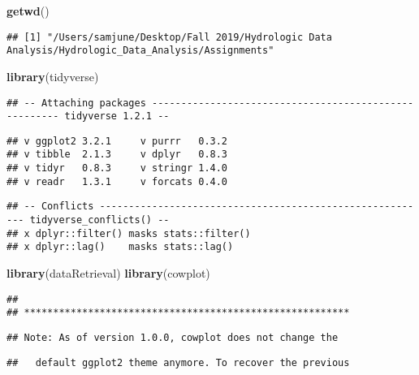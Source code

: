 \documentclass[]{article}
\newenvironment{Shaded}{\begin{snugshade}}{\end{snugshade}}
\newcommand{\KeywordTok}[1]{\textcolor[rgb]{0.13,0.29,0.53}{\textbf{#1}}}
\newcommand{\NormalTok}[1]{#1}
\begin{document}
\begin{Shaded}
\begin{Highlighting}[]
\KeywordTok{getwd}\NormalTok{()}
\end{Highlighting}
\end{Shaded}

\begin{verbatim}
## [1] "/Users/samjune/Desktop/Fall 2019/Hydrologic Data Analysis/Hydrologic_Data_Analysis/Assignments"
\end{verbatim}

\begin{Shaded}
\begin{Highlighting}[]
\KeywordTok{library}\NormalTok{(tidyverse)}
\end{Highlighting}
\end{Shaded}

\begin{verbatim}
## -- Attaching packages ------------------------------------------------------ tidyverse 1.2.1 --
\end{verbatim}

\begin{verbatim}
## v ggplot2 3.2.1     v purrr   0.3.2
## v tibble  2.1.3     v dplyr   0.8.3
## v tidyr   0.8.3     v stringr 1.4.0
## v readr   1.3.1     v forcats 0.4.0
\end{verbatim}

\begin{verbatim}
## -- Conflicts --------------------------------------------------------- tidyverse_conflicts() --
## x dplyr::filter() masks stats::filter()
## x dplyr::lag()    masks stats::lag()
\end{verbatim}

\begin{Shaded}
\begin{Highlighting}[]
\KeywordTok{library}\NormalTok{(dataRetrieval)}
\KeywordTok{library}\NormalTok{(cowplot)}
\end{Highlighting}
\end{Shaded}

\begin{verbatim}
## 
## ********************************************************
\end{verbatim}

\begin{verbatim}
## Note: As of version 1.0.0, cowplot does not change the
\end{verbatim}

\begin{verbatim}
##   default ggplot2 theme anymore. To recover the previous
\end{verbatim}
\end{document}
